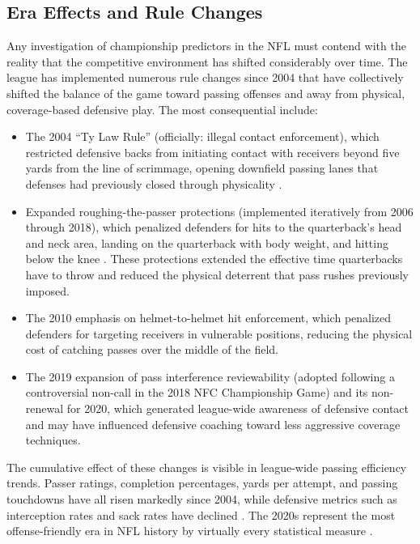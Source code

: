 \subsection{Era Effects and Rule Changes}
\label{sec:era-effects}

Any investigation of championship predictors in the NFL must contend with the reality that the competitive environment has shifted considerably over time. The league has implemented numerous rule changes since 2004 that have collectively shifted the balance of the game toward passing offenses and away from physical, coverage-based defensive play. The most consequential include:

\begin{itemize}
  \item The 2004 ``Ty Law Rule'' (officially: illegal contact enforcement), which restricted defensive backs from initiating contact with receivers beyond five yards from the line of scrimmage, opening downfield passing lanes that defenses had previously closed through physicality \parencite{nflops2004rules}.

  \item Expanded roughing-the-passer protections (implemented iteratively from 2006 through 2018), which penalized defenders for hits to the quarterback's head and neck area, landing on the quarterback with body weight, and hitting below the knee \parencite{pereira2018roughing}. These protections extended the effective time quarterbacks have to throw and reduced the physical deterrent that pass rushes previously imposed.

  \item The 2010 emphasis on helmet-to-helmet hit enforcement, which penalized defenders for targeting receivers in vulnerable positions, reducing the physical cost of catching passes over the middle of the field.

  \item The 2019 expansion of pass interference reviewability (adopted following a controversial non-call in the 2018 NFC Championship Game) and its non-renewal for 2020, which generated league-wide awareness of defensive contact and may have influenced defensive coaching toward less aggressive coverage techniques.
\end{itemize}

The cumulative effect of these changes is visible in league-wide passing efficiency trends. Passer ratings, completion percentages, yards per attempt, and passing touchdowns have all risen markedly since 2004, while defensive metrics such as interception rates and sack rates have declined \parencite{barnwell2019passingrevolution}. The 2020s represent the most offense-friendly era in NFL history by virtually every statistical measure \parencite{nflscoring2023trends}.

